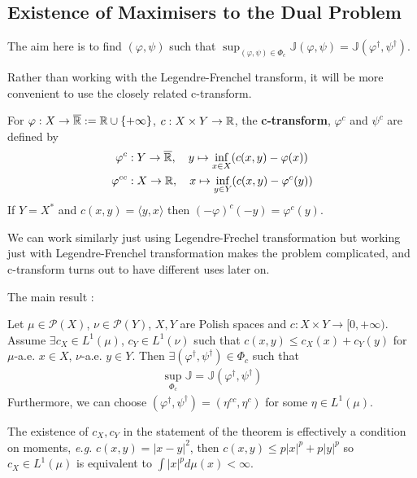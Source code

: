 \documentclass[12pt,a4paper]{article}
\begin{document}
\subsection{Existence of Maximisers to the Dual Problem}

The aim here is to find $(\varphi, \psi)$ such that $\sup_{(\varphi, \psi)\in \Phi_c} \mathbb{J}(\varphi, \psi) = \mathbb{J}(\varphi^{\dagger}, \psi^{\dagger})$.

\quad Rather than working with the Legendre-Frenchel transform, it will be more convenient to use the closely related c-transform.
\s

 For $\varphi : X\rightarrow \overline{\mathbb{R}} := \mathbb{R} \cup \{+\infty \}$, $c: X\times Y \rightarrow \mathbb{R}$, the \textbf{c-transform}, $\varphi^c$ and $\psi^c$ are defined by
\begin{align*}
\varphi^c &: Y\rightarrow \overline{\mathbb{R}}, \quad y\mapsto \inf_{x\in X} (c(x,y) - \varphi(x)) \\
\varphi^{cc} &: X\rightarrow \mathbb{R}, \quad x\mapsto \inf_{y\in Y} (c(x,y) -\varphi^c(y))
\end{align*}
If $Y= X^*$ and $c(x,y) = \langle y, x\rangle$ then $(-\varphi)^c (-y) = \varphi^c(y)$.

\quad We can work similarly just using Legendre-Frechel transformation but working just with Legendre-Frenchel transformation makes the problem complicated, and c-transform turns out to have different uses later on.
\s

The main result :
\s

 Let $\mu \in \mathscr{P}(X)$, $\nu\in \mathscr{P}(Y)$, $X,Y$ are Polish spaces and $c: X\times Y\rightarrow [0, +\infty)$. Assume $\exists c_X \in L^1(\mu)$, $c_Y \in L^1(\nu)$ such that $c(x,y) \leq c_X(x) + c_Y(y)$ for $\mu$-a.e. $x\in X$, $\nu$-a.e. $y\in Y$. Then $\exists (\varphi^{\dagger}, \psi^{\dagger}) \in \Phi_c$ such that
\begin{align*}
\sup_{\Phi_c} \mathbb{J}= \mathbb{J}(\varphi^{\dagger}, \psi^{\dagger})
\end{align*}
Furthermore, we can choose $(\varphi^{\dagger},\psi^{\dagger}) = (\eta^{cc}, \eta^c)$ for some $\eta \in L^1(\mu)$.
\s

The existence of $c_X,c_Y$ in the statement of the theorem is effectively a condition on moments, \textit{e.g.} $c(x,y) = |x-y|^2$, then $c(x,y) \leq p|x|^p + p|y|^p$ so $c_X \in L^1(\mu) $ is equivalent to $\int |x|^p d\mu(x) < \infty$.
\s

\newday
\end{document}
